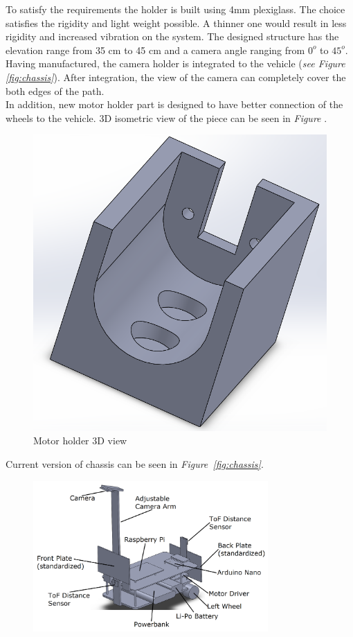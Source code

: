 \documentclass[a4paper,12pt]{article}
\begin{document}
\begin{enumerate}
To satisfy the requirements the holder is built using 4mm plexiglass. The choice satisfies the rigidity and light weight possible. A thinner one would result in less rigidity and increased vibration on the system. The designed structure has the elevation range from 35 cm to 45 cm and a camera angle ranging from $0^o$ to $45^o$. Having manufactured, the camera holder is integrated to the vehicle (\textit{see Figure \ref{fig:chassis}}). After integration, the view of the camera can completely cover the both edges of the path.\\

In addition, new motor holder part is designed to have better connection of the wheels to the vehicle. 3D isometric view of the piece can be seen in \textit{Figure }.
\begin{figure}[h]
	\includegraphics[width=.2\textheight,center]{images/motor-holder.png}
	\caption{Motor holder 3D view}
\end{figure}



Current version of chassis can be seen in \textit{Figure~\ref{fig:chassis}}.



\begin{figure}[h]

\includegraphics[width=0.8\textwidth,center]{images/chassis1}


\end{figure}
\end{enumerate}
\end{document}
